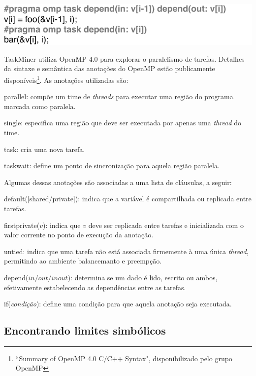\documentclass[sigplan,10pt,review]{acmart}
\newcommand\Taskminer{\mbox{\textsf{TaskMiner}}}
\begin{document}
\includegraphics[width=1\columnwidth]{images/ex_depends}

{\Taskminer} utiliza OpenMP 4.0 para explorar o paralelismo de tarefas. Detalhes da sintaxe e semântica
das anotações do OpenMP estão publicamente disponíveis\footnote{``Summary of OpenMP 4.0 C/C++ Syntax", disponibilizado
pelo grupo OpenMP}. As anotações utilizadas são:
%
\begin{compactitem}
\item \textsf{parallel}: compõe um time de \textit{threads}
para executar uma região do programa marcada como paralela.
\item \textsf{single}: especifica uma região que deve ser executada
por apenas uma \textit{thread} do time.
\item \textsf{task}: cria uma nova tarefa.
\item \textsf{taskwait}: define um ponto de sincronização para aquela
região paralela.
\end{compactitem}
%
Algumas dessas anotações são associadas a uma lista de cláusulas, a seguir:
\begin{compactitem}
\item \textsf{default([shared/private])}: indica que a variável é compartilhada ou replicada
entre tarefas.
\item \textsf{firstprivate($v$)}: indica que $v$ deve ser replicada entre tarefas e inicializada
com o valor corrente no ponto de execução da anotação.
\item \textsf{untied}: indica que uma tarefa não está associada firmemente à uma única \textit{thread},
permitindo ao ambiente balancemanto e preempção.
\item \textsf{depend}($\mathit{in}/\mathit{out}/\mathit{inout}$): determina se um dado é lido, escrito
ou ambos, efetivamente estabelecendo as dependências entre as tarefas.
\item \textsf{if}({\em condição}): define uma condição para que aquela anotação seja executada.
\end{compactitem}

\subsection{Encontrando limites simbólicos}
\label{sec:sra}
\end{document}
